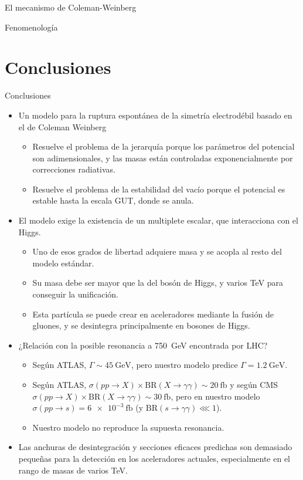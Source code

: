 \documentclass{beamer}
\begin{document}
\begin{frame}{El mecanismo de Coleman-Weinberg}
\begin{frame}{Fenomenología}
\section{Conclusiones}
\begin{frame}{Conclusiones}
\begin{itemize}
\item<only@1> Un modelo para la ruptura espontánea de la simetría electrodébil basado en el de Coleman Weinberg
\begin{itemize}
\item Resuelve el problema de la jerarquía porque los parámetros del potencial son adimensionales, y las masas están controladas exponencialmente por correcciones radiativas.
\item Resuelve el problema de la estabilidad del vacío porque el potencial es estable hasta la escala GUT, donde se anula.
\end{itemize}
\item<only@2> El modelo exige la existencia de un multiplete escalar, que interacciona con el Higgs. 
\begin{itemize}
\item Uno de esos grados de libertad adquiere masa y se acopla al resto del modelo estándar.
\item Su masa debe ser mayor que la del bosón de Higgs, y varios \si{\tera\electronvolt} para conseguir la unificación.
\item Esta partícula se puede crear en aceleradores mediante la fusión de gluones, y se desintegra principalmente en bosones de Higgs. 
\end{itemize}
\item<only@3> ¿Relación con la posible resonancia a \SI{750}{\giga\electronvolt} encontrada por LHC?
\begin{itemize}
\item Según ATLAS, $\Gamma\sim \SI{45}{\giga\electronvolt}$, pero nuestro modelo predice $\Gamma = \SI{1.2}{\giga\electronvolt}$.
\item Según ATLAS, $\sigma(pp\to X)\times \mathrm{BR}(X \to \gamma\gamma) \sim \SI{20}{\femto\barn}$ y según CMS $\sigma(pp\to X)\times \mathrm{BR}(X \to \gamma\gamma) \sim \SI{30}{\femto\barn}$, pero en nuestro modelo $\sigma(pp\to s)= \SI{6e-3}{\femto\barn}$ (y $\mathrm{BR}(s \to \gamma\gamma)\lll 1$).
\item Nuestro modelo no reproduce la supuesta resonancia.
\end{itemize}
\item<only@3> Las anchuras de desintegración y secciones eficaces predichas son demasiado pequeñas para la detección en los aceleradores actuales, especialmente en el rango de masas de varios \si{\tera\electronvolt}.
\end{itemize}
\end{frame}


\end{frame}
\end{frame}
\end{document}

